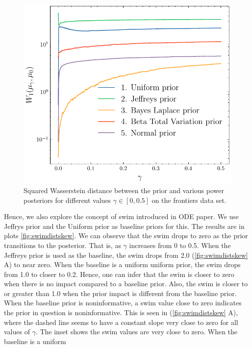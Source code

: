 \documentclass[12pt]{article}
\begin{document}
\begin{figure}[h]
\begin{center}
\includegraphics{imgs/wasser_distskew.pdf}
\end{center}
\caption{Squared Wasserstein distance between the prior and various power posteriors for different values $\gamma \in [0, 0.5]$ on the frontiers data set.}\label{fig:skew_diff_priors}
\end{figure}
Hence, we also explore the concept of \gls{swim} introduced in ODE paper. We
use Jeffrys prior and the Uniform prior as baseline priors for this. The
results are in plots \cref{fig:swimdistskew}. We can observe that the
\gls{swim} drops to zero as the prior transitions to the posterior. That is, as
$\gamma$ increases from 0 to 0.5. When the Jeffreys prior is used as the
baseline, the \gls{swim}  drops from 2.0 (\cref{fig:swimdistskew} A) to near
zero. When the baseline is a uniform uniform prior, the \gls{swim} drops from
1.0 to closer to 0.2. Hence, one can infer that the \gls{swim} is closer to
zero when there is no impact compared to a baseline prior. Also, the \gls{swim}
is closer to or greater than 1.0 when the prior impact is different from the
baseline prior. When the baseline prior is noninformative, a \gls{swim} value
close to zero indicates the prior in question is noninformative. This is seen
in (\cref{fig:swimdistskew} A), where the dashed line seems to have a constant
slope very close to zero for all values of $\gamma$. The inset shows the
\gls{swim} values are very close to zero. When the baseline is a uniform
\end{document}
